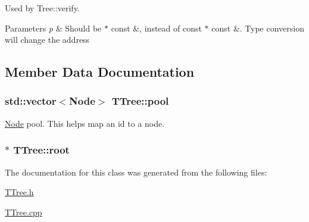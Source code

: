 Used by Tree\+::verify. 


\begin{DoxyParams}{Parameters}
{\em p} & Should be $\ast$ const \&, instead of const $\ast$ const \&. Type conversion will change the address \\
\hline
\end{DoxyParams}


\subsection{Member Data Documentation}
\hypertarget{classTTree_a58f7a793347834e9caee3d87c7202966}{}
\subsubsection[{pool}]{\setlength{\rightskip}{0pt plus 5cm}std\+::vector$<${\bf Node}$>$ T\+Tree\+::pool\hspace{0.3cm}{\ttfamily [private]}}\label{classTTree_a58f7a793347834e9caee3d87c7202966}


\hyperlink{structTTree_1_1Node}{Node} pool. This helps map an id to a node. 

\hypertarget{classTTree_a76972bd24a6d2f940fe1645d008a4a04}{}
\subsubsection[{root}]{$\ast$ T\+Tree\+::root\hspace{0.3cm}{\ttfamily [private]}}\label{classTTree_a76972bd24a6d2f940fe1645d008a4a04}


The documentation for this class was generated from the following files\+:\begin{DoxyCompactItemize}
\item 
\hyperlink{TTree_8h}{T\+Tree.\+h}\item 
\hyperlink{TTree_8cpp}{T\+Tree.\+cpp}\end{DoxyCompactItemize}
